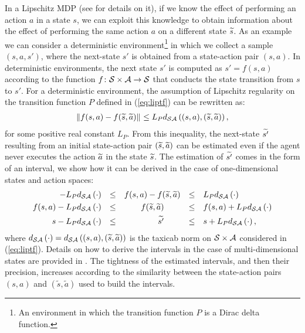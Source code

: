 \newline
In a Lipschitz \ac{MDP} (see  for details on it), if we know the effect of performing an action $a$ in a state $s$, we can exploit this knowledge to obtain information about the effect of performing the same action $a$ on a different state $\widetilde{s}$.
As an example we can consider a deterministic environment\footnote{An environment in which the transition function $P$ is a Dirac delta function.} in which we collect a sample $(s,a,s')$, where the next-state $s'$ is obtained from a state-action pair $(s, a)$. In deterministic environments, the next state $s'$ is computed as $s' = f(s,a)$ according to the function $f\colon\mathcal{S}\times\mathcal{A}\to\mathcal{S}$ that conducts the state transition from $s$ to $s'$. For a deterministic environment, the assumption of Lipschitz regularity on the transition function $P$ defined in (\ref{eq:liptf}) can be rewritten as:
\begin{align}
	\left\|f(s,a)-f(\widetilde{s},\widetilde{a})\right\|_{} \leq L_{P}d_{\mathcal{S}\mathcal{A}}\left((s,a),(\widetilde{s},\widetilde{a})\right),
\end{align}
for some positive real constant $L_{P}$. From this inequality, the next-state $\widetilde{s'}$ resulting from an initial state-action pair $(\widetilde{s}, \widetilde{a})$ can be estimated even if the agent never executes the action $\widetilde{a}$ in the state $\widetilde{s}$. The estimation of $\widetilde{s'}$ comes in the form of an interval, we show how it can be derived in the case of one-dimensional states and action spaces:
\begin{align}
	-L_{P}d_{\mathcal{S}\mathcal{A}}\left(\cdot\right) &&\leq&& f(s,a)-f(\widetilde{s},\widetilde{a}) &&\leq&& &L_{P}d_{\mathcal{S}\mathcal{A}}\left(\cdot\right) \nonumber\\
	f(s,a) -L_{P}d_{\mathcal{S}\mathcal{A}}\left(\cdot\right) &&\leq&&  \qquad f(\widetilde{s},\widetilde{a}) \qquad  &&\leq&& &f(s,a) + L_{P}d_{\mathcal{S}\mathcal{A}}\left(\cdot\right) \nonumber\\
	s -L_{P}d_{\mathcal{S}\mathcal{A}}\left(\cdot\right) &&\leq&&  \qquad \widetilde{s'} \qquad  &&\leq&& &s + L_{P}d_{\mathcal{S}\mathcal{A}}\left(\cdot\right),
\end{align}
where $d_{\mathcal{S}\mathcal{A}}\left(\cdot\right) = d_{\mathcal{S}\mathcal{A}}\left((s,a),(\widetilde{s},\widetilde{a})\right)$ is the taxicab norm on $\mathcal{S} \times \mathcal{A}$ considered in (\ref{eq:liptf}). Details on how to derive the intervals in the case of multi-dimensional states are provided in .
The tightness of the estimated intervals, and then their precision, increases according to the similarity between the state-action pairs $(s, a)$ and $(\widetilde{s}, \widetilde{a})$ used to build the intervals.
